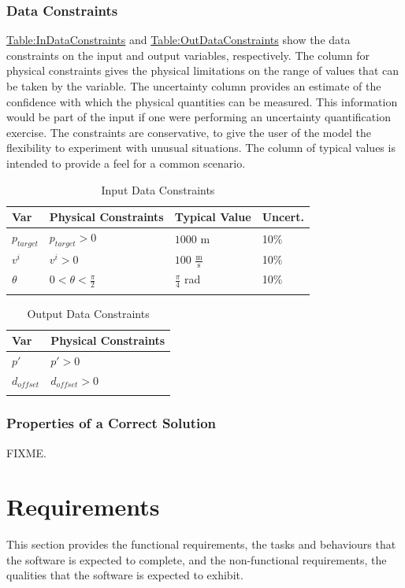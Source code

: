 \documentclass[12pt]{article}
\begin{document}
\subsubsection{Data Constraints}
\label{Sec:DataConstraints}
\hyperref[Table:InDataConstraints]{Table:InDataConstraints} and \hyperref[Table:OutDataConstraints]{Table:OutDataConstraints} show the data constraints on the input and output variables, respectively. The column for physical constraints gives the physical limitations on the range of values that can be taken by the variable. The uncertainty column provides an estimate of the confidence with which the physical quantities can be measured. This information would be part of the input if one were performing an uncertainty quantification exercise. The constraints are conservative, to give the user of the model the flexibility to experiment with unusual situations. The column of typical values is intended to provide a feel for a common scenario.
\begin{longtable}{l l l l}
\toprule
Var & Physical Constraints & Typical Value & Uncert.
\\
\midrule
\endhead
${p_{target}}$ & ${p_{target}}>0$ & $1000$ m & 10$\%$
\\
${v^{i}}$ & ${v^{i}}>0$ & $100$ $\frac{\text{m}}{\text{s}}$ & 10$\%$
\\
$θ$ & $0<θ<\frac{π}{2}$ & $\frac{π}{4}$ rad & 10$\%$
\\
\bottomrule
\caption{Input Data Constraints}
\label{Table:InDataConstraints}
\end{longtable}
\begin{longtable}{l l}
\toprule
Var & Physical Constraints
\\
\midrule
\endhead
$p'$ & $p'>0$
\\
${d_{offset}}$ & ${d_{offset}}>0$
\\
\bottomrule
\caption{Output Data Constraints}
\label{Table:OutDataConstraints}
\end{longtable}
\subsubsection{Properties of a Correct Solution}
\label{Sec:CorSolProps}
FIXME.
\section{Requirements}
\label{Sec:Requirements}
This section provides the functional requirements, the tasks and behaviours that the software is expected to complete, and the non-functional requirements, the qualities that the software is expected to exhibit.
\end{document}
